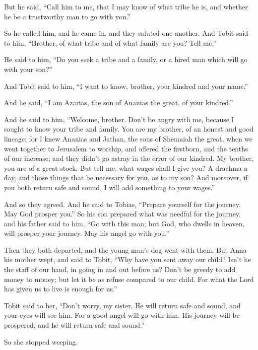 But he said, ``Call him to me, that I may know of what tribe he is, and
whether he be a trustworthy man to go with you.''

 So he called him, and he came in, and they saluted one
another.  And Tobit said to him, ``Brother, of what tribe
and of what family are you? Tell me.''

 He said to him, ``Do you seek a tribe and a family, or a
hired man which will go with your son?''

And Tobit said to him, ``I want to know, brother, your kindred and your
name.''

 And he said, ``I am Azarias, the son of Ananias the
great, of your kindred.''

 And he said to him, ``Welcome, brother. Don't be angry
with me, because I sought to know your tribe and family. You are my
brother, of an honest and good lineage; for I knew Ananias and Jathan,
the sons of Shemaiah the great, when we went together to Jerusalem to
worship, and offered the firstborn, and the tenths of our increase; and
they didn't go astray in the error of our kindred. My brother, you are
of a great stock.  But tell me, what wages shall I give
you? A drachma a day, and those things that be necessary for you, as to
my son?  And moreover, if you both return safe and sound,
I will add something to your wages.''

 And so they agreed. And he said to Tobias, ``Prepare
yourself for the journey. May God prosper you.'' So his son prepared
what was needful for the journey, and his father said to him, ``Go with
this man; but God, who dwells in heaven, will prosper your journey. May
his angel go with you.''

Then they both departed, and the young man's dog went with them.
 But Anna his mother wept, and said to Tobit, ``Why have
you sent away our child? Isn't he the staff of our hand, in going in and
out before us?  Don't be greedy to add money to money;
but let it be as refuse compared to our child.  For what
the Lord has given us to live is enough for us.''

 Tobit said to her, ``Don't worry, my sister. He will
return safe and sound, and your eyes will see him.  For a
good angel will go with him. His journey will be prospered, and he will
return safe and sound.''

 So she stopped weeping.

